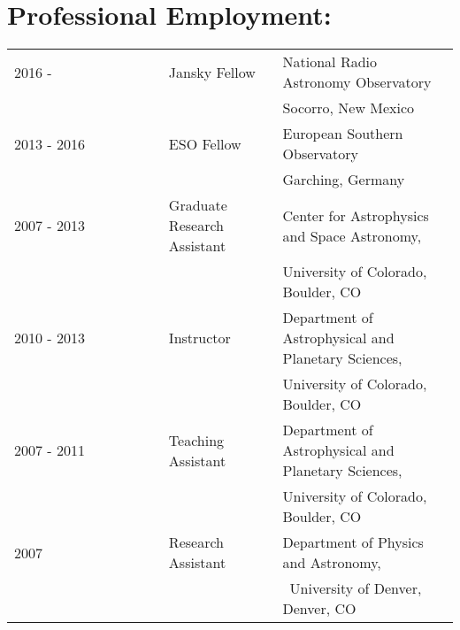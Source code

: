 \setlength{\extrarowheight}{2pt}
\section*{Professional Employment:}
\begin{listliketab}
    \begin{tabular}{lll}
    2016 -      & Jansky Fellow  & National Radio Astronomy Observatory\\
                 &         & Socorro, New Mexico \\
    2013 - 2016 & ESO Fellow  & European Southern Observatory\\
                 &         & Garching, Germany \\
    2007 - 2013 & Graduate Research Assistant & Center for Astrophysics and Space Astronomy, \\
              &                             & University of Colorado, Boulder, CO \\
    2010 - 2013 & Instructor  & Department of Astrophysical and Planetary Sciences, \\
                           && University of Colorado, Boulder, CO \\
    2007 - 2011    & Teaching Assistant & Department of Astrophysical and Planetary Sciences, \\
                                    && University of Colorado, Boulder, CO \\
    2007 & Research Assistant & Department of Physics and Astronomy, \\
                                          && University of Denver, Denver, CO \\
    \end{tabular}
\end{listliketab}

